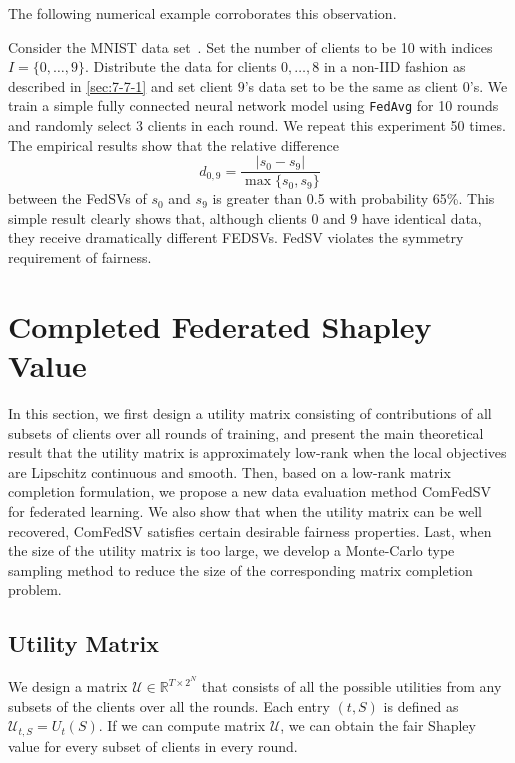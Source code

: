 The following numerical example corroborates this observation.

\begin{example} \label{ex:unfair}
    Consider the MNIST data set~\cite{lecun-mnisthandwrittendigit-2010}. Set the number of clients to be 10 with indices $I = \{0, \dots, 9\}$. Distribute the data for clients $0, \dots, 8$ in a non-IID fashion as described in \autoref{sec:7-7-1} and set client $9$'s data set to be the same as client $0$'s. We train a simple fully connected neural network model using \texttt{FedAvg} for 10 rounds and randomly select 3 clients in each round. We repeat this experiment 50 times. The empirical results show that the relative difference 
    \begin{equation} \label{eq:relative_difference}
            d_{0,9} = \frac{|s_0 - s_9|}{\max\{s_0, s_9\}}
    \end{equation}
    between the FedSVs of $s_0$ and $s_{9}$ is greater than 0.5 with probability 65\%. This simple result clearly shows that, although clients $0$ and $9$ have identical data, they receive dramatically different FEDSVs. FedSV violates the symmetry requirement of fairness.  
\end{example}


\section{Completed Federated Shapley Value} \label{sec:7-6}

In this section, we first design a utility matrix consisting of contributions of all subsets of clients over all rounds of training, and present the main theoretical result that the utility matrix is approximately low-rank when the local objectives are Lipschitz continuous and smooth. Then, based on a low-rank matrix completion formulation, we propose a new data evaluation method ComFedSV for federated learning. We also show that when the utility matrix can be well recovered, ComFedSV satisfies certain desirable fairness properties. Last, when the size of the utility matrix is too large, we develop a Monte-Carlo type sampling method to reduce the size of the corresponding matrix completion problem.

\subsection{Utility Matrix} \label{sec:7-6-1}
We design a matrix $\mathcal{U} \in \mathbb{R}^{T \times 2^N}$ that consists of all the possible utilities from any subsets of the clients over all the rounds. Each entry $(t, S)$ is defined as 
$\mathcal{U}_{t, S} = U_t(S)$. If we can compute matrix $\mathcal{U}$, we can obtain the fair Shapley value for every subset of clients in every round.

